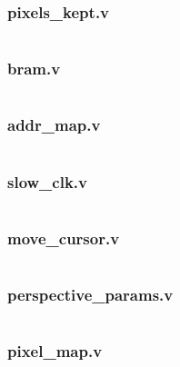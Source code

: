 \documentclass{article}
\begin{document}
\subsubsection{pixels\_kept.v}
\inputminted[linenos]{verilog}{../../src/pixels_kept.v}
\subsubsection{bram.v}
\inputminted[linenos]{verilog}{../../src/bram.v}
\subsubsection{addr\_map.v}
\inputminted[linenos]{verilog}{../../src/addr_map.v}
\subsubsection{slow\_clk.v}
\inputminted[linenos]{verilog}{../../src/slow_clk.v}
\subsubsection{move\_cursor.v}
\inputminted[linenos]{verilog}{../../src/move_cursor.v}
\subsubsection{perspective\_params.v}
\inputminted[linenos]{verilog}{../../src/perspective_params.v}
\subsubsection{pixel\_map.v}
\inputminted[linenos]{verilog}{../../src/pixel_map.v}
\end{document}
